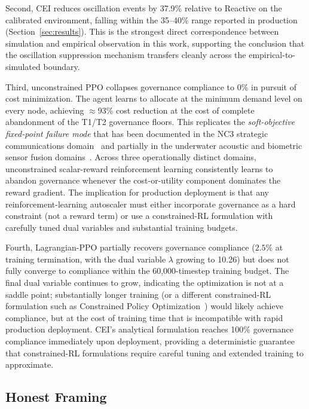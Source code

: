 \documentclass[runningheads]{llncs}
\begin{document}
Second, CEI reduces oscillation events by 37.9\% relative to Reactive on the calibrated environment, falling within the 35--40\% range reported in production (Section~\ref{sec:results}). This is the strongest direct correspondence between simulation and empirical observation in this work, supporting the conclusion that the oscillation suppression mechanism transfers cleanly across the empirical-to-simulated boundary.

Third, unconstrained PPO collapses governance compliance to 0\% in pursuit of cost minimization. The agent learns to allocate at the minimum demand level on every node, achieving $\approx$93\% cost reduction at the cost of complete abandonment of the T1/T2 governance floors. This replicates the \emph{soft-objective fixed-point failure mode} that has been documented in the NC3 strategic communications domain~\cite{paper1} and partially in the underwater acoustic and biometric sensor fusion domains~\cite{paper2}. Across three operationally distinct domains, unconstrained scalar-reward reinforcement learning consistently learns to abandon governance whenever the cost-or-utility component dominates the reward gradient. The implication for production deployment is that any reinforcement-learning autoscaler must either incorporate governance as a hard constraint (not a reward term) or use a constrained-RL formulation with carefully tuned dual variables and substantial training budgets.

Fourth, Lagrangian-PPO partially recovers governance compliance ($2.5\%$ at training termination, with the dual variable $\lambda$ growing to 10.26) but does not fully converge to compliance within the 60{,}000-timestep training budget. The final dual variable continues to grow, indicating the optimization is not at a saddle point; substantially longer training (or a different constrained-RL formulation such as Constrained Policy Optimization~\cite{achiam}) would likely achieve compliance, but at the cost of training time that is incompatible with rapid production deployment. CEI's analytical formulation reaches 100\% governance compliance immediately upon deployment, providing a deterministic guarantee that constrained-RL formulations require careful tuning and extended training to approximate.

\subsection{Honest Framing}
\end{document}
